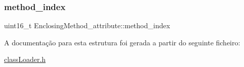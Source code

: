 \hypertarget{struct_enclosing_method__attribute_a077d63409d5f2285537a02632ed1952a}{}\label{struct_enclosing_method__attribute_a077d63409d5f2285537a02632ed1952a} 
\subsubsection{\texorpdfstring{method\+\_\+index}{method\_index}}
{\footnotesize\ttfamily uint16\+\_\+t Enclosing\+Method\+\_\+attribute\+::method\+\_\+index}



A documentação para esta estrutura foi gerada a partir do seguinte ficheiro\+:\begin{DoxyCompactItemize}
\item 
\hyperlink{class_loader_8h}{class\+Loader.\+h}\end{DoxyCompactItemize}
